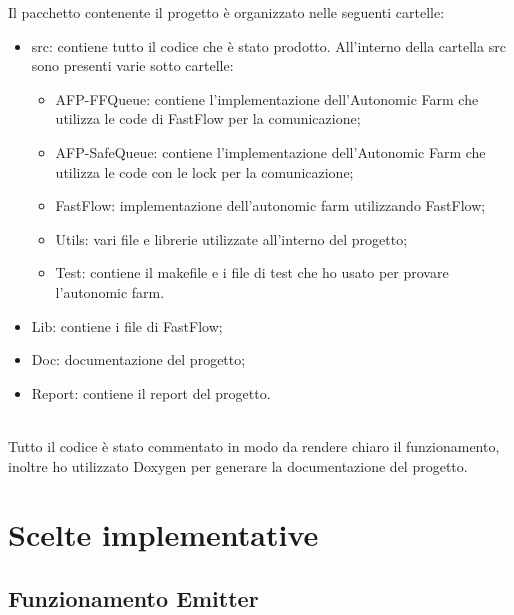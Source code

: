 \documentclass[12pt]{report}
\begin{document}
Il pacchetto contenente il progetto è organizzato nelle seguenti cartelle:
\begin{itemize}
\item src: contiene tutto il codice che è stato prodotto. All'interno della cartella src sono presenti varie sotto cartelle:
\begin{itemize}
\item AFP-FFQueue: contiene l'implementazione dell'Autonomic Farm che utilizza le code di FastFlow per la comunicazione;
\item AFP-SafeQueue: contiene l'implementazione dell'Autonomic Farm che utilizza le code con le lock per la comunicazione; 
\item FastFlow: implementazione dell'autonomic farm utilizzando FastFlow;
\item Utils: vari file e librerie utilizzate all'interno del progetto;
\item Test: contiene il makefile e i file di test che ho usato per provare l'autonomic farm.
\end{itemize}
\item Lib: contiene i file di FastFlow;
\item Doc: documentazione del progetto;
\item Report: contiene il report del progetto.
\end{itemize}\\Tutto il codice è stato commentato in modo da rendere chiaro il funzionamento, inoltre ho utilizzato Doxygen per generare la documentazione del progetto.

\chapter{Scelte implementative}

\section{Funzionamento Emitter}
\end{document}
